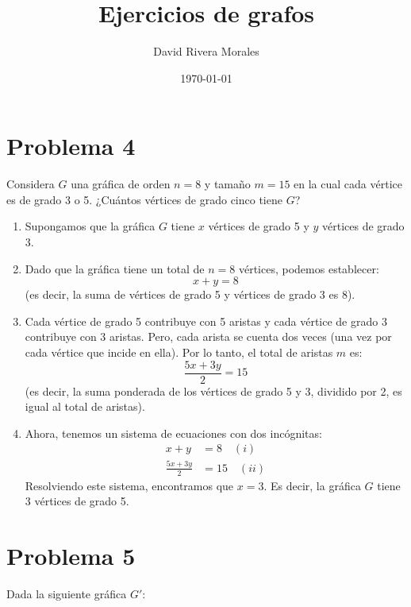 \documentclass[12pt]{article}
\title{Ejercicios de grafos}
\author{David Rivera Morales}
\date{\today}
\begin{document}
\maketitle

\section*{Problema 4}
Considera \( G \) una gráfica de orden \( n = 8 \) y tamaño \( m = 15 \) en la cual cada vértice es de grado 3 o 5. ¿Cuántos vértices de grado cinco tiene \( G \)?
\begin{enumerate}
	\item Supongamos que la gráfica \( G \) tiene \( x \) vértices de grado 5 y \( y \) vértices de grado 3.
	\item Dado que la gráfica tiene un total de \( n = 8 \) vértices, podemos establecer:
	      \[ x + y = 8 \]
	      (es decir, la suma de vértices de grado 5 y vértices de grado 3 es 8).
	\item Cada vértice de grado 5 contribuye con 5 aristas y cada vértice de grado 3 contribuye con 3 aristas. Pero, cada arista se cuenta dos veces (una vez por cada vértice que incide en ella). Por lo tanto, el total de aristas \( m \) es:
	      \[ \frac{5x + 3y}{2} = 15 \]
	      (es decir, la suma ponderada de los vértices de grado 5 y 3, dividido por 2, es igual al total de aristas).
	\item Ahora, tenemos un sistema de ecuaciones con dos incógnitas:
	      \begin{align*}
		      x + y             & = 8 \quad (i)   \\
		      \frac{5x + 3y}{2} & = 15 \quad (ii)
	      \end{align*}
	      Resolviendo este sistema, encontramos que \( x = 3 \). Es decir, la gráfica \( G \) tiene 3 vértices de grado 5.
\end{enumerate}


\section*{Problema 5}
Dada la siguiente gráfica \( G' \):
\end{document}
